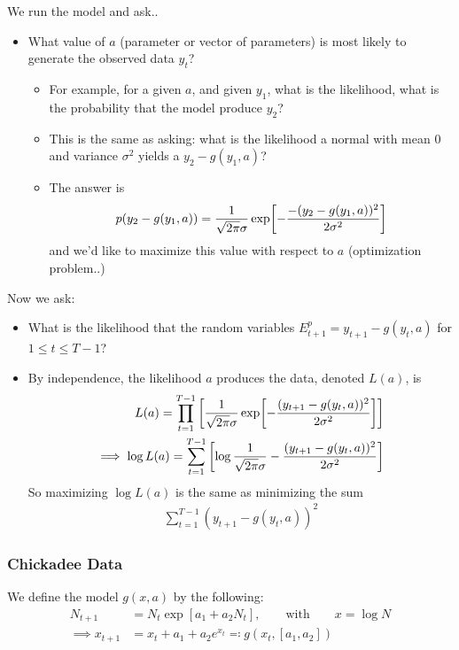 \documentclass{article}
\begin{document}
            We run the model and ask..
            \begin{itemize}
                \item What value of $a$ (parameter or vector of parameters) is most likely to generate the observed data $y_t$?
                \begin{itemize}
                    \item For example, for a given $a$, and given $y_1$, what is the likelihood, what is the probability that the model produce $y_2$?
                    \item This is the same as asking: what is the likelihood a normal with mean $0$ and variance $\sigma^2$ yields a $y_2 - g(y_1,a)$?
                    \item The answer is
                    \begin{align}
                        p\qty(y_2 - g(y_1,a)) = \frac{1}{\sqrt{2\pi}\sigma}\exp[-\frac{-(y_2 - g(y_1,a))^2}{2\sigma^2}]
                    \end{align}
                    and we'd like to maximize this value with respect to $a$ (optimization problem..)
                \end{itemize}
            \end{itemize} 
            Now we ask:
            \begin{itemize}
                \item What is the likelihood that the random variables $E_{t+1}^p = y_{t+1} - g(y_t,a)$ for $1 \leq t \leq T-1$?
                \item By independence, the likelihood $a$ produces the data, denoted $L(a)$, is
                \begin{align}
                    L(a) = \prod_{t=1}^{T-1}\qty[\frac{1}{\sqrt{2\pi}\sigma}\exp[-\frac{(y_{t+1} - g(y_t,a))^2}{2\sigma^2}]] \\
                    \implies \log L(a) = \sum_{t=1}^{T-1} \qty[\log\frac{1}{\sqrt{2\pi}\sigma} - \frac{(y_{t+1} - g(y_t,a))^2}{2\sigma^2}]
                \end{align}
                So maximizing $\log L(a)$ is the same as minimizing the sum
                \begin{align}
                    \sum_{t=1}^{T-1}(y_{t+1} - g(y_t,a))^2
                \end{align}
            \end{itemize}

            \subsubsection{Chickadee Data}
                We define the model $g(x, a)$ by the following:
                \begin{align}
                    N_{t+1} &= N_t \exp[a_1 + a_2 N_t], \qquad \text{with} \qquad x = \log N \\
                    \implies x_{t+1} &= x_t + a_1 + a_2 e^{x_t} \eqqcolon g(x_t, [a_1,a_2])
                \end{align}
\end{document}
